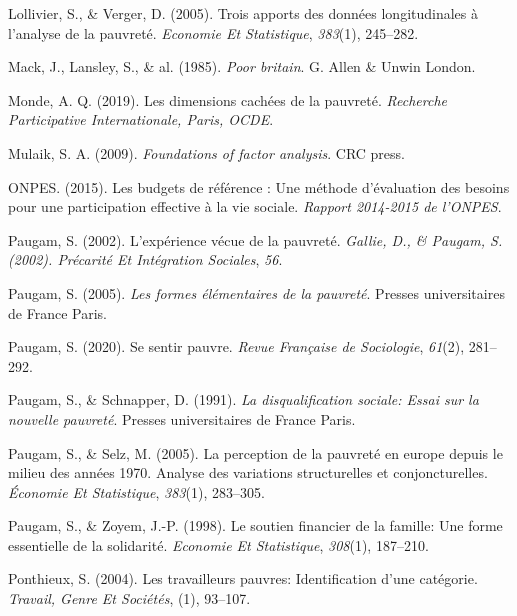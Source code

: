 \documentclass[12pt,a4paper]{reedthesis}
\newenvironment{CSLReferences}%
  {}%
  {\par}
\begin{document}
\begin{CSLReferences}{1}{0}
\leavevmode\hypertarget{ref-lollivier2005trois}{}%
Lollivier, S., \& Verger, D. (2005). Trois apports des donn{é}es longitudinales {à} l'analyse de la pauvret{é}. \emph{Economie Et Statistique}, \emph{383}(1), 245--282.

\leavevmode\hypertarget{ref-mack1985poor}{}%
Mack, J., Lansley, S., \& al. (1985). \emph{Poor britain}. G. Allen \& Unwin London.

\leavevmode\hypertarget{ref-atdquartmonde}{}%
Monde, A. Q. (2019). Les dimensions cachées de la pauvreté. \emph{Recherche Participative Internationale, Paris, OCDE}.

\leavevmode\hypertarget{ref-mulaik2009foundations}{}%
Mulaik, S. A. (2009). \emph{Foundations of factor analysis}. CRC press.

\leavevmode\hypertarget{ref-onpes}{}%
ONPES. (2015). Les budgets de référence : Une méthode d'évaluation des besoins pour une participation effective à la vie sociale. \emph{Rapport 2014-2015 de l'ONPES}.

\leavevmode\hypertarget{ref-paugam2002experience}{}%
Paugam, S. (2002). L'exp{é}rience v{é}cue de la pauvret{é}. \emph{Gallie, D., \& Paugam, S. (2002). Précarité Et Intégration Sociales}, \emph{56}.

\leavevmode\hypertarget{ref-paugam2005formes}{}%
Paugam, S. (2005). \emph{Les formes {é}l{é}mentaires de la pauvret{é}}. Presses universitaires de France Paris.

\leavevmode\hypertarget{ref-paugam2020se}{}%
Paugam, S. (2020). Se sentir pauvre. \emph{Revue Fran{ç}aise de Sociologie}, \emph{61}(2), 281--292.

\leavevmode\hypertarget{ref-paugam1991disqualification}{}%
Paugam, S., \& Schnapper, D. (1991). \emph{La disqualification sociale: Essai sur la nouvelle pauvret{é}}. Presses universitaires de France Paris.

\leavevmode\hypertarget{ref-paugam2005perception}{}%
Paugam, S., \& Selz, M. (2005). La perception de la pauvret{é} en europe depuis le milieu des ann{é}es 1970. Analyse des variations structurelles et conjoncturelles. \emph{{É}conomie Et Statistique}, \emph{383}(1), 283--305.

\leavevmode\hypertarget{ref-paugam1998soutien}{}%
Paugam, S., \& Zoyem, J.-P. (1998). Le soutien financier de la famille: Une forme essentielle de la solidarit{é}. \emph{Economie Et Statistique}, \emph{308}(1), 187--210.

\leavevmode\hypertarget{ref-ponthieux2004travailleurs}{}%
Ponthieux, S. (2004). Les travailleurs pauvres: Identification d'une cat{é}gorie. \emph{Travail, Genre Et Soci{é}t{é}s}, (1), 93--107.


\end{CSLReferences}
\end{document}
